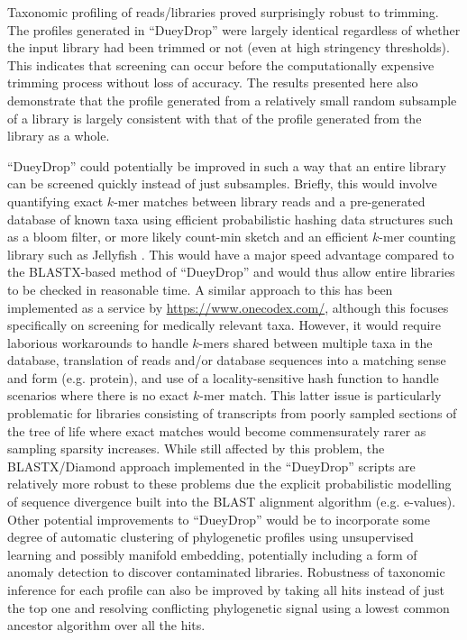 Taxonomic profiling of reads/libraries proved surprisingly robust to trimming.  The profiles
generated in ``DueyDrop'' were largely identical regardless of whether the input library 
had been trimmed or not (even at high stringency thresholds).  This indicates that
screening can occur before the computationally expensive trimming process without loss
of accuracy.   
The results presented here also demonstrate that the profile
generated from a relatively small random subsample of a library is largely consistent 
with that of the profile generated from the library as a whole.
 
``DueyDrop'' could potentially be improved in such a way that an entire library can be screened quickly instead of just subsamples.
Briefly, this would involve quantifying exact \(k\)-mer matches between library reads and a pre-generated database of known taxa
using efficient probabilistic hashing data structures such as a bloom filter, or more likely count-min sketch and an efficient
\(k\)-mer counting library such as Jellyfish \citep{Marcais2011}.  This would have a major speed advantage compared to the BLASTX-based method of ``DueyDrop''
and would thus allow entire libraries to be checked in reasonable time.  A similar approach to this has been implemented as a service
by \url{https://www.onecodex.com/}, although this focuses specifically on screening for medically relevant taxa. 
However, it would require laborious workarounds to handle
\(k\)-mers shared between multiple taxa in the database, translation of reads and/or database sequences into a matching sense and form (e.g. protein),
and use of a locality-sensitive hash function to handle scenarios where there is no exact \(k\)-mer match. This latter issue is particularly
problematic for libraries consisting of transcripts from poorly sampled sections of the tree of life where exact matches would become
commensurately rarer as sampling sparsity increases.  
While still affected by this problem, the BLASTX/Diamond approach implemented in the ``DueyDrop'' scripts are relatively more robust to these
problems due the explicit probabilistic modelling of sequence divergence built into the BLAST alignment algorithm (e.g. e-values).
Other potential improvements to ``DueyDrop'' would be to incorporate some degree of 
automatic clustering of phylogenetic profiles using unsupervised learning and possibly manifold embedding, potentially
including a form of anomaly detection to discover contaminated libraries.  
Robustness of taxonomic inference for each profile can also be improved by taking all hits instead of just the top one
and resolving conflicting phylogenetic signal using a lowest common ancestor algorithm over all the hits.

